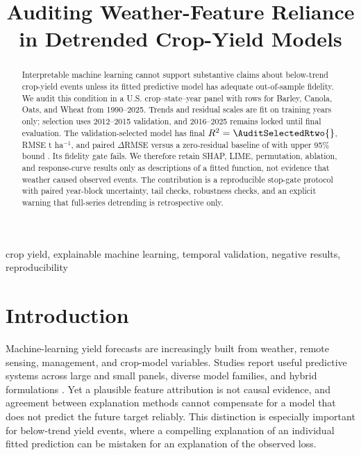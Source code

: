 \documentclass[conference]{IEEEtran}
\title{Auditing Weather-Feature Reliance in Detrended Crop-Yield Models}
\author{\IEEEauthorblockN{Anonymous Submission}}
\begin{document}
\maketitle

\begin{abstract}
Interpretable machine learning cannot support substantive claims about below-trend
crop-yield events unless its fitted predictive model has adequate out-of-sample
fidelity. We audit this condition in a U.S. crop--state--year panel with
\AuditTotalRows{} rows for Barley, Canola, Oats, and Wheat from 1990--2025.
Trends and residual scales are fit on training years only; selection uses
2012--2015 validation, and 2016--2025 remains locked until final evaluation. The
validation-selected \AuditSelectedModel{} \AuditSelectedFamily{} model has final
$R^2=\AuditSelectedRtwo{}$, RMSE \AuditSelectedRMSE{} t ha$^{-1}$, and paired
$\Delta$RMSE versus a zero-residual baseline of \AuditSelectedDeltaRMSE{} with
upper 95\% bound \AuditSelectedDeltaHigh{}. Its fidelity gate fails. We therefore
retain SHAP, LIME, permutation, ablation, and response-curve results only as
descriptions of a fitted function, not evidence that weather caused observed
events. The contribution is a reproducible stop-gate protocol with paired
year-block uncertainty, tail checks, robustness checks, and an explicit warning
that full-series detrending is retrospective only.
\end{abstract}

\begin{IEEEkeywords}
crop yield, explainable machine learning, temporal validation, negative results,
reproducibility
\end{IEEEkeywords}

\section{Introduction}
Machine-learning yield forecasts are increasingly built from weather, remote
sensing, management, and crop-model variables. Studies report useful predictive
systems across large and small panels, diverse model families, and hybrid
formulations \cite{Paudel2021,Meroni2021,Khaki2019,LengHall2020,Klompenburg2020,Chlingaryan2018,Shahhosseini2021}.
Yet a plausible feature attribution is not causal evidence, and agreement between
explanation methods cannot compensate for a model that does not predict the future
target reliably. This distinction is especially important for below-trend yield
events, where a compelling explanation of an individual fitted prediction can be
mistaken for an explanation of the observed loss.
\end{document}
